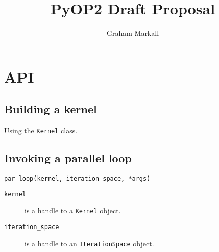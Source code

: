\documentclass[a4paper]{article}
\author{Graham Markall}
\title{PyOP2 Draft Proposal}
\begin{document}
\maketitle

\section{API}

\subsection{Building a kernel}

Using the \verb|Kernel| class.

\subsection{Invoking a parallel loop}

\begin{verbatim}
par_loop(kernel, iteration_space, *args)
\end{verbatim}

\begin{description}
  \item[\texttt{kernel}] is a handle to a \verb|Kernel| object.
  \item[\texttt{iteration\_space}] is a handle to an \verb|IterationSpace| object.
\end{description}
\end{document}
